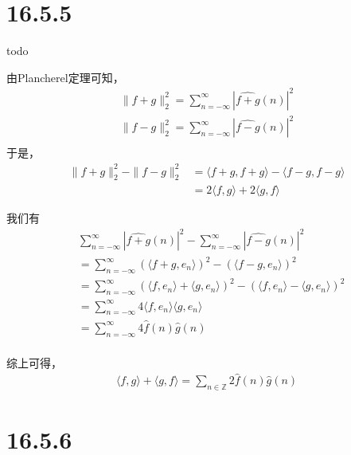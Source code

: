 \documentclass{article}
\begin{document}
\begin{itemize}
\end{itemize}

\section*{16.5.5}

todo

由Plancherel定理可知，
\begin{align*}
  \|f + g\|_2^2 = \sum\limits_{n = -\infty}^{\infty} |\widehat{f + g}(n)|^2 \\
  \|f - g\|_2^2 = \sum\limits_{n = -\infty}^{\infty} |\widehat{f - g}(n)|^2 \\
\end{align*}
于是，
\begin{align*}
  \|f + g\|_2^2 - \|f - g\|_2^2
   & = \langle f + g, f + g \rangle - \langle f - g, f - g \rangle \\
   & = 2 \langle f, g \rangle + 2\langle g, f \rangle
\end{align*}

我们有
\begin{align*}
   & \sum\limits_{n = -\infty}^{\infty} |\widehat{f + g}(n)|^2 - \sum\limits_{n = -\infty}^{\infty} |\widehat{f - g}(n)|^2                          \\
   & = \sum\limits_{n = -\infty}^{\infty} (\langle f + g, e_n \rangle)^2 - (\langle f - g, e_n \rangle)^2                                           \\
   & = \sum\limits_{n = -\infty}^{\infty} (\langle f, e_n \rangle + \langle g, e_n \rangle)^2 - (\langle f, e_n \rangle - \langle g, e_n \rangle)^2 \\
   & = \sum\limits_{n = -\infty}^{\infty} 4 \langle f, e_n \rangle \langle g, e_n \rangle                                                           \\
   & = \sum\limits_{n = -\infty}^{\infty} 4 \hat{f}(n)\hat{g}(n)                                                                                    \\
\end{align*}

综上可得，
\begin{align*}
  \langle f, g \rangle + \langle g, f \rangle = \sum\limits_{n \in \mathbb{Z}} 2 \hat{f}(n)\hat{g}(n)
\end{align*}


\section*{16.5.6}
\end{document}
